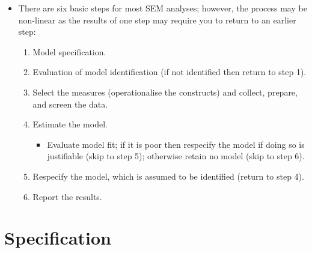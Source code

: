 \documentclass[
  a4paper,
  DIV=11,
  numbers=noendperiod]{scrreprt}
\providecommand{\tightlist}{%
  \setlength{\itemsep}{0pt}\setlength{\parskip}{0pt}}\usepackage{longtable,booktabs,array}
\begin{document}
\begin{itemize}
\tightlist
\item
  There are six basic steps for most SEM analyses; however, the process
  may be non-linear as the results of one step may require you to return
  to an earlier step:

  \begin{enumerate}
  \def\labelenumi{\arabic{enumi}.}
  \tightlist
  \item
    Model specification.
  \item
    Evaluation of model identification (if not identified then return to
    step 1).
  \item
    Select the measures (operationalise the constructs) and collect,
    prepare, and screen the data.
  \item
    Estimate the model.

    \begin{itemize}
    \tightlist
    \item
      Evaluate model fit; if it is poor then respecify the model if
      doing so is justifiable (skip to step 5); otherwise retain no
      model (skip to step 6).
    \end{itemize}
  \item
    Respecify the model, which is assumed to be identified (return to
    step 4).
  \item
    Report the results.
  \end{enumerate}
\end{itemize}

\section{Specification}\label{specification}
\end{document}
